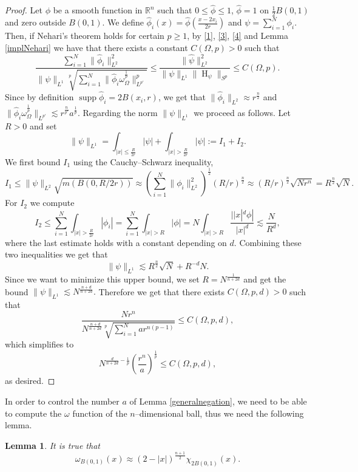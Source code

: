 \documentclass[footinclude=true]{amsart}
\theoremstyle{plain}
\newtheorem{lm}[theo]{Lemma}
\DeclareMathOperator{\Ha}{H}
\DeclareMathOperator{\supp}{supp}
\begin{document}
	\begin{proof}
		Let $\phi$ be a smooth function in $\mathbb{R}^{n}$ such that $0\leq \widehat{\phi}\leq 1$, $\widehat{\phi}=1$ on $\frac{1}{2}B(0,1)$ and zero outside $B(0,1)$. We define $\widehat{\phi}_{i}(x)=\widehat{\phi}(\frac{x-2x_{i}}{2r})$ and $\psi=\sum_{i=1}^{N}\phi_{i}$. Then, if Nehari's theorem holds for certain $p\geq 1$, by \eqref{1}, \eqref{3}, \eqref{4} and Lemma \ref{implNehari} we have that there exists a constant $C(\Omega,p)>0$ such that
		$$ \dfrac{\sum_{i=1}^{N}\|\widehat{\phi}_{i}\|_{L^{2}}^{2}}{\|\psi\|_{L^{1}}\sqrt[p]{\sum_{i=1}^{N}\|\widehat{\phi}_{i}\omega_{\Omega}^{\frac{1}{p}}\|_{L^{p'}}^{p}}}\leq \dfrac{\|\widehat{\psi}\|^{2}_{L^{2}}}{\|\psi\|_{L^{1}}\|\Ha_{\psi}\|_{S^{p}}}\leq C(\Omega,p).$$
		Since by definition $\supp\widehat{\phi}_{i}=2B(x_{i},r)$, we get that $\|\widehat{\phi}_{i}\|_{L^{2}}\approx r^{\frac{n}{2}}$ and $\|\widehat{\phi}_{i}\omega_{\Omega}^{\frac{1}{p}}\|_{L^{p'}}\lesssim r^{\frac{n}{p'}}a^{\frac{1}{p}}$. Regarding the norm $\|\psi\|_{L^{1}}$ we proceed as follows. Let $R>0$ and set $$\|\psi\|_{L^{1}}=\int_{|x|\leq\frac{R}{2r}}|\psi|+\int_{|x|>\frac{R}{2r}}|\psi|:=I_{1}+I_{2}.$$
		We first bound $I_{1}$ using the Cauchy--Schwarz inequality,
		$$I_{1}\leq \|\psi\|_{L^{2}}\sqrt{m(B(0,R/2r))}\approx \left(\sum_{i=1}^{N}\|\phi_{i}\|_{L^{2}}^{2} \right)^{\frac{1}{2}} (R/r)^{\frac{n}{2}}\approx(R/r)^{\frac{n}{2}}\sqrt{Nr^{n}}=R^{\frac{n}{2}}\sqrt{N}.$$
		For $I_{2}$ we compute 
		$$I_{2}\leq \sum_{i=1}^{N}\int_{|x|>\frac{R}{2r}}|\phi_{i}|=\sum_{i=1}^{N}\int_{|x|>R}|\phi|=N\int_{|x|>R}\frac{||x|^{d}\phi|}{|x|^{d}}\lesssim \frac{N}{R^{d}},$$ where the last estimate holds with a constant depending on $d$. Combining these two inequalities we get that
		$$\|\psi\|_{L^{1}}\lesssim R^{\frac{n}{2}}\sqrt{N}+R^{-d}N.$$ Since we want to minimize this upper bound, we set $R=N^{\frac{1}{n+2d}}$ and get the bound $\|\psi\|_{L^{1}}\lesssim N^{\frac{n+d}{n+2d}}.$ Therefore we get that there exists $C(\Omega,p,d)>0$ such that 
		$$\dfrac{Nr^{n}}{N^{\frac{n+d}{n+2d}}\sqrt[p]{\sum_{i=1}^{N}ar^{n(p-1)}}}\leq C(\Omega,p,d),$$ which simplifies to $$N^{\frac{d}{n+2d}-\frac{1}{p}}\left(\frac{r^{n}}{a}\right)^{\frac{1}{p}}\leq C(\Omega,p,d),$$ as desired.
	\end{proof}
	In order to control the number $a$ of Lemma \ref{generalnegation}, we need to be able to compute the $\omega$ function of the $n$--dimensional ball, thus we need the following lemma.
	\begin{lm}\label{computew}
		It is true that 
		$$\omega_{B(0,1)}(x)\approx (2-|x|)^{\frac{n+1}{2}}\chi_{2B(0,1)}(x).$$ 
	\end{lm}
\end{document}
